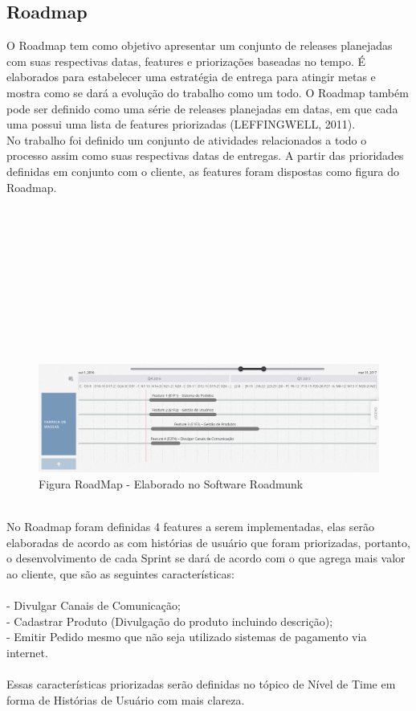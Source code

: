 \subsection{Roadmap}
O Roadmap tem como objetivo apresentar um conjunto de releases planejadas com suas respectivas datas, features e priorizações baseadas no tempo. É elaborados para estabelecer uma estratégia de entrega para atingir metas e mostra como se dará a evolução do trabalho como um todo. O Roadmap também pode ser definido como uma série de releases planejadas em datas, em que cada uma possui uma lista de features priorizadas (LEFFINGWELL, 2011).\\
\tab No trabalho foi definido um conjunto de atividades relacionados a todo o processo assim como suas respectivas datas de entregas. A partir das prioridades definidas em conjunto com o cliente, as features foram dispostas como figura do Roadmap.\\
\tab \\ \\ \\ \\ \\ \\ \\ \\ \\ \\
\begin{figure}[h]
    \centering
    \label{fig01}
        \includegraphics[keepaspectratio=true,scale=0.3]{figuras/roadmunk.eps}
    \caption{Figura RoadMap - Elaborado no Software Roadmunk}
\end{figure}
\\
\tab No Roadmap foram definidas 4 features a serem implementadas, elas serão elaboradas de acordo as com histórias de usuário que foram priorizadas, portanto, o desenvolvimento de cada Sprint se dará de acordo com o que agrega mais valor ao cliente, que são as seguintes características:\\
\\
\tab - Divulgar Canais de Comunicação;\\
\tab - Cadastrar Produto (Divulgação do produto incluindo descrição);\\
\tab - Emitir Pedido mesmo que não seja utilizado sistemas de pagamento via internet.\\
\\
\tab Essas características priorizadas serão definidas no tópico de Nível de Time em forma de Histórias de Usuário com mais clareza.\\

